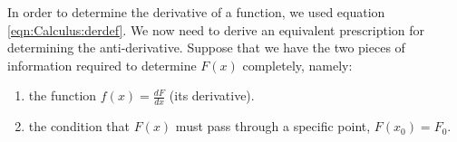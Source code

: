 In order to determine the derivative of a function, we used equation \ref{eqn:Calculus:derdef}. We now need to derive an equivalent prescription for determining the anti-derivative. Suppose that we have the two pieces of information required to determine $F(x)$ completely, namely:
\begin{enumerate}
\item the function $f(x)=\frac{dF}{dx}$ (its derivative).
\item the condition that $F(x)$ must pass through a specific point, $F(x_0)=F_0$.
\end{enumerate}

